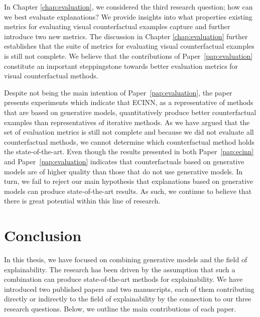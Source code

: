 \documentclass[11pt,a4paper,twoside,openright,final]{memoir}
\newcommand*{\paperref}[1]{Paper~\hyperref[#1]{\ref{#1}}}
\begin{document}
In Chapter \ref{chap:evaluation}, we considered the third research question; how can we best evaluate explanations?
We provide insights into what properties existing metrics for evaluating visual counterfactual examples capture and further introduce two new metrics.  
The discussion in Chapter \ref{chap:evaluation} further establishes that the suite of metrics for evaluating visual counterfactual examples is still not complete.
We believe that the contributions of \paperref{pap:evaluation} constitute an important steppingstone towards better evaluation metrics for visual counterfactual methods.

Despite not being the main intention of \paperref{pap:evaluation}, the paper presents experiments which indicate that ECINN, as a representative of methods that are based on generative models, quantitatively produce better counterfactual examples than representatives of iterative methods. 
As we have argued that the set of evaluation metrics is still not complete and because we did not evaluate all counterfactual methods, we cannot determine which counterfactual method holds the state-of-the-art.
Even though the results presented in both \paperref{pap:ecinn} and \paperref{pap:evaluation} indicates that counterfactuals based on generative models are of higher quality than those that do not use generative models.
In turn, we fail to reject our main hypothesis that explanations based on generative models can produce state-of-the-art results.
As such, we continue to believe that there is great potential within this line of research.



\section{Conclusion}\label{sec:conclusion-conclusion}
In this thesis, we have focused on combining generative models and the field of explainability.
The research has been driven by the assumption that such a combination can produce state-of-the-art methods for explainability. 
We have introduced two published papers and two manuscripts, each of them contributing directly or indirectly to the field of explainability by the connection to our three research questions. 
Below, we outline the main contributions of each paper.
\end{document}
